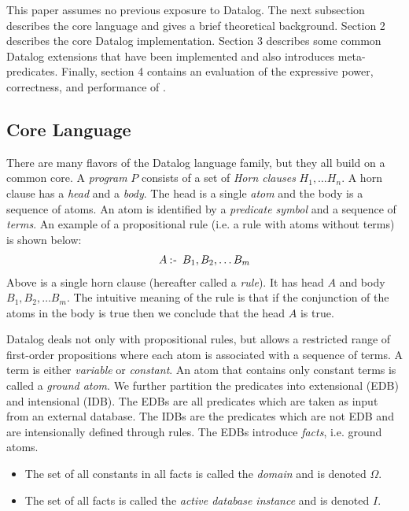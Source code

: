 This paper assumes no previous exposure to Datalog. The next subsection describes the core language and gives a brief theoretical background. Section 2 describes the core Datalog implementation. Section 3 describes some common Datalog extensions that have been implemented and also introduces meta-predicates. Finally, section 4 contains an evaluation of the expressive power, correctness, and performance of \datalogM.

\subsection{Core Language}
There are many flavors of the Datalog language family, but they all build on a common core. A \textit{program} $P$ consists of a set of \textit{Horn clauses} $H_1, \ldots H_n$. A horn clause has a \textit{head} and a \textit{body}. The head is a single \textit{atom} and the body is a sequence of atoms. An atom is identified by a \textit{predicate symbol} and a sequence of \textit{terms}. An example of a propositional rule (i.e. a rule with atoms without terms) is shown below:
\vspace*{-5pt}
\begin{align*}
A \mathbin{:\hspace{-0.5ex}\textsf{-}} \;B_1, B_2, \ldots B_m
\end{align*}
\noindent
Above is a single horn clause (hereafter called a \textit{rule}). It has head $A$ and body $B_1, B_2, \ldots B_m$. The intuitive meaning of the rule is that if the conjunction of the atoms in the body is true then we conclude that the head $A$ is true.

Datalog deals not only with propositional rules, but allows a restricted range of first-order propositions where each atom is associated with a sequence of terms. A term is either \textit{variable} or \textit{constant}. An atom that contains only constant terms is called a \textit{ground atom}. We further partition the predicates into extensional (EDB) and intensional (IDB). The EDBs are all predicates which are taken as input from an external database. The IDBs are the predicates which are not EDB and are intensionally defined through rules. The EDBs introduce \textit{facts}, i.e. ground atoms. 

\begin{itemize}
\item The set of all constants in all facts is called the \textit{domain} and is denoted $\Omega$.
\item The set of all facts is called the \textit{active database instance} and is denoted $I$.
\end{itemize}
 
